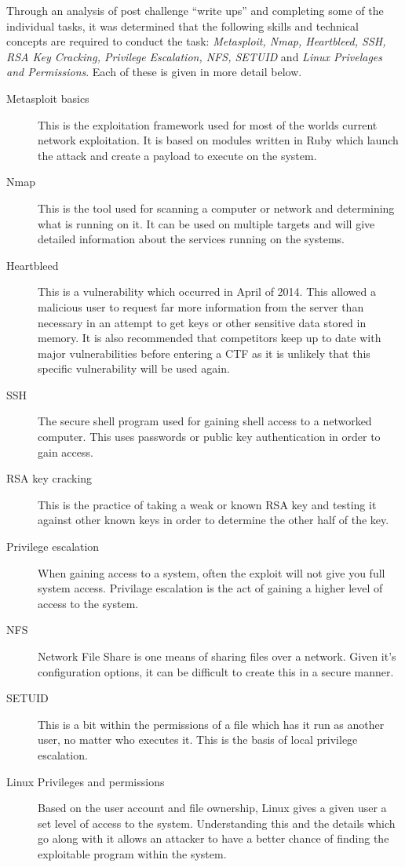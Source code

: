 \documentclass[a4paper,11pt]{report}
\begin{document}
			Through an analysis of post challenge ``write ups'' and completing some of the individual tasks, 
			it was determined that the following skills and technical concepts are required to conduct the task: 
			\textit{Metasploit, Nmap, Heartbleed, SSH, RSA Key Cracking, Privilege Escalation, NFS, SETUID} and \textit{Linux Privelages and Permissions}.
			Each of these is given in more detail below. 
			\begin{description}
				\item[Metasploit basics] 
					This is the exploitation framework used for most of the worlds current network exploitation. 
					It is based on modules written in Ruby which launch the attack and create a payload to execute on the system. 
				\item[Nmap]
					This is the tool used for scanning a computer or network and determining what is running on it. 
					It can be used on multiple targets and will give detailed information about the services running on the systems. 
				\item[Heartbleed]
					This is a vulnerability which occurred in April of 2014. 
					This allowed a malicious user to request far more information from the server than necessary in an attempt to get keys or other sensitive data stored in memory. 
					It is also recommended that competitors keep up to date with major vulnerabilities before entering a CTF as it is unlikely that this specific vulnerability will be used again.
				\item[SSH]
					The secure shell program used for gaining shell access to a networked computer. 
					This uses passwords or public key authentication in order to gain access. 
				\item[RSA key cracking] 
					This is the practice of taking a weak or known RSA key and testing it against other known keys in order to determine the other half of the key. 
				\item[Privilege escalation] 
					When gaining access to a system, often the exploit will not give you full system access. 
					Privilage escalation is the act of gaining a higher level of access to the system. 
				\item[NFS]
					Network File Share is one means of sharing files over a network. 
					Given it's configuration options, it can be difficult to create this in a secure manner. 
				\item[SETUID] 
					This is a bit within the permissions of a file which has it run as another user, no matter who executes it. 
					This is the basis of local privilege escalation. 
				\item[Linux Privileges and permissions] 
					Based on the user account and file ownership, Linux gives a given user a set level of access to the system. 
					Understanding this and the details which go along with it allows an attacker to have a better chance of finding the exploitable program within the system. 
			\end{description}
\end{document}
